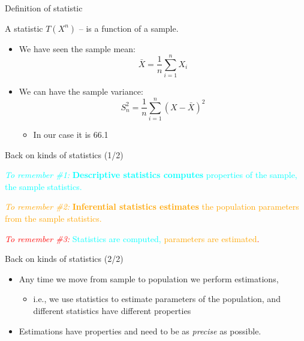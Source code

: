 \documentclass{beamer}
\begin{document}
\begin{frame}
{\centerline{Definition of statistic}}

A statistic $T(X^n)$ -- is a function of a sample. 
\newline


\begin{itemize}

\item We have seen the sample mean:
$$ \bar{X} = \frac{1}{n}\sum_{i=1}^{n}X_i$$ 
\newline

\item We can have the sample variance:
$$ S^2_n = \frac{1}{n}\sum_{i=1}^{n}(X-\bar{X})^2$$
\begin{itemize}
\item In our case it is 66.1
\end{itemize}
\end{itemize}

\end{frame}



\begin{frame}
{\centerline{Back on kinds of statistics (1/2)}}


\begin{center}

 \textcolor{cyan}{{\it To remember \#1:} \textbf{Descriptive statistics computes} properties of the sample, the sample statistics.}
 
 \vspace*{1cm}

 \textcolor{orange}{{\it To remember \#2:} \textbf{Inferential statistics estimates}  the population parameters from the sample statistics.}

 \vspace*{1cm}

\textcolor{red}{{\it To remember \#3:}  \textcolor{cyan}{Statistics are computed,}  \textcolor{orange}{parameters are estimated}.}
\end{center}


\end{frame}

\begin{frame}
{\centerline{Back on kinds of statistics (2/2)}}

\begin{itemize}
\item Any time we move from sample to population we perform estimations,
\begin{itemize}
\item i.e., we use statistics to estimate parameters of the population, and different statistics have different properties
\end{itemize}
\item Estimations have properties and need to be as \textit{precise} as possible.
\end{itemize}

\end{frame}
\end{document}
